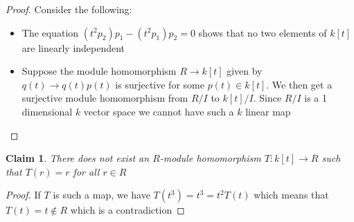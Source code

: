 \documentclass[a4paper,11pt]{article}
\newtheorem{claim}{Claim}
\begin{document}
\begin{proof}
  Consider the following:
  \begin{itemize}
    \item The equation $(t^2p_2)p_1 - (t^2p_1)p_2=0$ shows that no two elements of $k[t]$ are linearly independent
    \item Suppose the module homomorphism $R \to k[t]$ given by $q(t) \to q(t)p(t)$ is surjective for some $p(t) \in k[t]$.
          We then get a surjective module homomorphism from $R/I$ to $k[t]/I$.
          Since $R/I$ is a 1 dimensional $k$ vector space we cannot have such a $k$ linear map
  \end{itemize}
\end{proof}

\begin{claim}
  There does not exist an $R$-module homomorphism $T:k[t] \to R$ such that $T(r)=r$ for all $r \in R$
\end{claim}

\begin{proof}
  If $T$ is such a map, we have $T(t^3)=t^3=t^2T(t)$ which means that $T(t)=t \notin R$ which is a contradiction
\end{proof}
\end{document}
